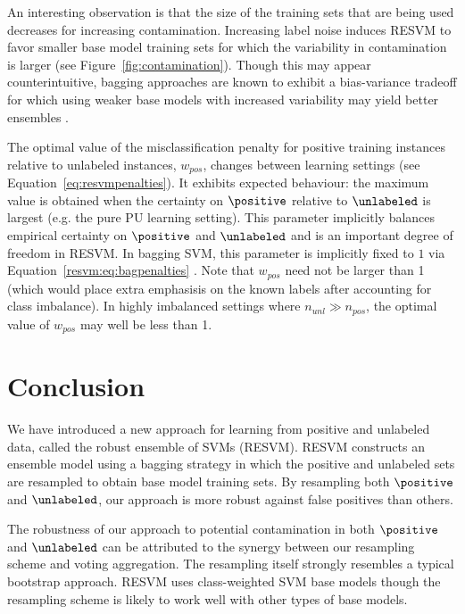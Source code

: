 An interesting observation is that the size of the training sets that are being used decreases for increasing contamination. Increasing label noise induces RESVM to favor smaller base model training sets for which the variability in contamination is larger (see Figure~\ref{fig:contamination}). Though this may appear counterintuitive, bagging approaches are known to exhibit a bias-variance tradeoff \citep{bauer1999empirical} for which using weaker base models with increased variability may yield better ensembles \citep{biasvariance}.

The optimal value of the misclassification penalty for positive training instances relative to unlabeled instances, $w_{pos}$, changes between learning settings (see Equation~\eqref{eq:resvmpenalties}). It exhibits expected behaviour: the maximum value is obtained when the certainty on $\positive$ relative to $\unlabeled$ is largest (e.g. the pure PU learning setting). This parameter implicitly balances empirical certainty on $\positive$ and $\unlabeled$ and is an important degree of freedom in RESVM. In bagging SVM, this parameter is implicitly fixed to $1$ via Equation~\eqref{resvm:eq:bagpenalties} \citep{mordelet2014bagging}. Note that $w_{pos}$ need not be larger than 1 (which would place extra emphasisis on the known labels after accounting for class imbalance). In highly imbalanced settings where $n_{unl} \gg n_{pos}$, the optimal value of $w_{pos}$ may well be less than 1.


\section{Conclusion}
We have introduced a new approach for learning from positive and unlabeled data, called the robust ensemble of SVMs (RESVM). RESVM constructs an ensemble model using a bagging strategy in which the positive and unlabeled sets are resampled to obtain base model training sets. By resampling both $\positive$ and $\unlabeled$, our approach is more robust against false positives than others.

The robustness of our approach to potential contamination in both $\positive$ and $\unlabeled$ can be attributed to the synergy between our resampling scheme and voting aggregation. The resampling itself strongly resembles a typical bootstrap approach. RESVM uses class-weighted SVM base models though the resampling scheme is likely to work well with other types of base models.

